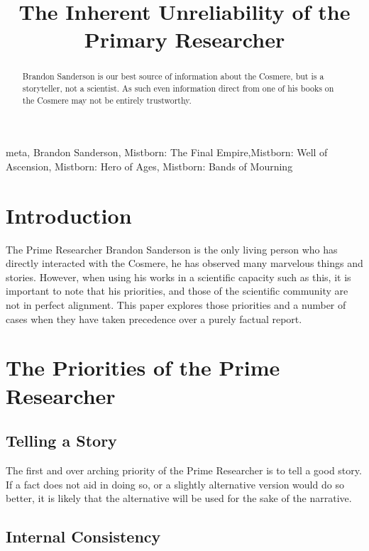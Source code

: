 \documentclass[conference]{IEEEtran}
\begin{document}
\title{The Inherent Unreliability of the Primary Researcher}

\author{
}

\maketitle

\begin{abstract}
Brandon Sanderson is our best source of information about the Cosmere, but is a storyteller, not a scientist.  As such even information direct from one of his books on the Cosmere may not be entirely trustworthy.
\end{abstract}

\begin{IEEEkeywords}
meta, Brandon Sanderson, Mistborn: The Final Empire,Mistborn: Well of Ascension, Mistborn: Hero of Ages, Mistborn: Bands of Mourning
\end{IEEEkeywords}

\section{Introduction}
The Prime Researcher Brandon Sanderson is the only living person who has directly interacted with the Cosmere, he has observed many marvelous things and stories.  However, when using his works in a scientific capacity such as this, it is important to note that his priorities, and those of the scientific community are not in perfect alignment.  This paper explores those priorities and a number of cases when they have taken precedence over a purely factual report.

\section{The Priorities of the Prime Researcher}

\subsection{Telling a Story}
The first and over arching priority of the Prime Researcher is to tell a good story.  If a fact does not aid in doing so, or a slightly alternative version would do so better, it is likely that the alternative will be used for the sake of the narrative.
\subsection{Internal Consistency}
\end{document}
